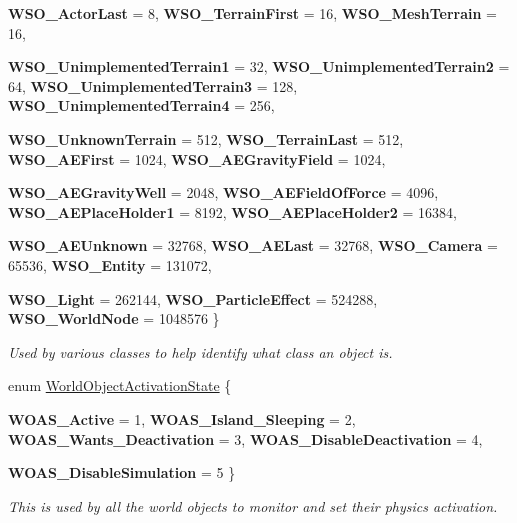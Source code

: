 \begin{DoxyCompactItemize}
{\bfseries WSO\_\-ActorLast} =  8, 
{\bfseries WSO\_\-TerrainFirst} =  16, 
{\bfseries WSO\_\-MeshTerrain} =  16, 
\par
{\bfseries WSO\_\-UnimplementedTerrain1} =  32, 
{\bfseries WSO\_\-UnimplementedTerrain2} =  64, 
{\bfseries WSO\_\-UnimplementedTerrain3} =  128, 
{\bfseries WSO\_\-UnimplementedTerrain4} =  256, 
\par
{\bfseries WSO\_\-UnknownTerrain} =  512, 
{\bfseries WSO\_\-TerrainLast} =  512, 
{\bfseries WSO\_\-AEFirst} =  1024, 
{\bfseries WSO\_\-AEGravityField} =  1024, 
\par
{\bfseries WSO\_\-AEGravityWell} =  2048, 
{\bfseries WSO\_\-AEFieldOfForce} =  4096, 
{\bfseries WSO\_\-AEPlaceHolder1} =  8192, 
{\bfseries WSO\_\-AEPlaceHolder2} =  16384, 
\par
{\bfseries WSO\_\-AEUnknown} =  32768, 
{\bfseries WSO\_\-AELast} =  32768, 
{\bfseries WSO\_\-Camera} =  65536, 
{\bfseries WSO\_\-Entity} =  131072, 
\par
{\bfseries WSO\_\-Light} =  262144, 
{\bfseries WSO\_\-ParticleEffect} =  524288, 
{\bfseries WSO\_\-WorldNode} =  1048576
 \}
\begin{DoxyCompactList}\small\item\em Used by various classes to help identify what class an object is. \item\end{DoxyCompactList}\item 
enum \hyperlink{namespaceMezzanine_ac4d9d4570b1963390325ad6a083108e1}{WorldObjectActivationState} \{ \par
{\bfseries WOAS\_\-Active} =  1, 
{\bfseries WOAS\_\-Island\_\-Sleeping} =  2, 
{\bfseries WOAS\_\-Wants\_\-Deactivation} =  3, 
{\bfseries WOAS\_\-DisableDeactivation} =  4, 
\par
{\bfseries WOAS\_\-DisableSimulation} =  5
 \}
\begin{DoxyCompactList}\small\item\em This is used by all the world objects to monitor and set their physics activation. \item\end{DoxyCompactList}\end{DoxyCompactItemize}
